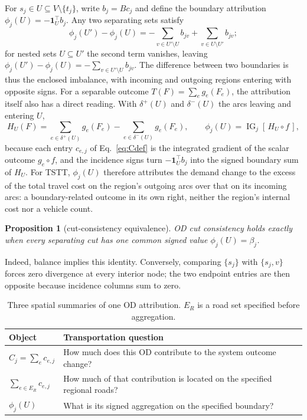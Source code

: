 \documentclass[a4paper,fleqn]{cas-sc}
\newtheorem*{uproposition}{Proposition}
\begin{document}
For $s_j\in U\subseteq V\setminus\{t_j\}$, write $b_j=Bc_j$ and define
the boundary attribution $\phi_j(U)=-\mathbf1_U^\top b_j$. Any two
separating sets satisfy
\begin{equation}
\phi_j(U')-\phi_j(U)
=-\sum_{v\in U'\setminus U}b_{jv}
+\sum_{v\in U\setminus U'}b_{jv};
\label{eq:cutdiff}
\end{equation}
for nested sets $U\subseteq U'$ the second term vanishes, leaving
$\phi_j(U')-\phi_j(U)=-\sum_{v\in U'\setminus U}b_{jv}$.
The difference between two boundaries is thus the enclosed imbalance,
with incoming and outgoing regions entering with opposite signs.
For a separable outcome $T(F)=\sum_e g_e(F_e)$, the attribution itself
also has a direct reading. With $\delta^+(U)$ and $\delta^-(U)$ the
arcs leaving and entering $U$,
\begin{equation}
H_U(F)=\sum_{e\in\delta^+(U)}g_e(F_e)-\sum_{e\in\delta^-(U)}g_e(F_e),
\qquad
\phi_j(U)=\operatorname{IG}_j[\,H_U\circ f\,],
\label{eq:hboundary}
\end{equation}
because each entry $c_{e,j}$ of Eq.~\eqref{eq:Cdef} is the
integrated gradient of the scalar outcome $g_e\circ f$, and the
incidence signs turn $-\mathbf 1_U^\top b_j$ into the
signed boundary sum of $H_U$. For TSTT, $\phi_j(U)$ therefore
attributes the demand change to the excess of the total travel cost on
the region's outgoing arcs over that on its incoming arcs: a
boundary-related outcome in its own right, neither the region's
internal cost nor a vehicle count.
\begin{uproposition}[cut-consistency equivalence]\label{par:cutequiv}
OD cut consistency holds exactly when every separating cut has one common
signed value $\phi_j(U)=\beta_j$.
\end{uproposition}
Indeed, balance implies this identity. Conversely, comparing $\{s_j\}$
with $\{s_j,v\}$ forces zero divergence at every interior node; the two
endpoint entries are then opposite because incidence columns sum to zero.

\begin{table}[pos=tb]
\footnotesize
\caption{Three spatial summaries of one OD attribution. $E_R$ is a road set
specified before aggregation.}\label{tab:objects}
\begin{tabular*}{\tblwidth}{@{}p{5cm}p{9cm}@{}}
\toprule Object & Transportation question\\\midrule
$C_j=\sum_ec_{e,j}$ & How much does this OD contribute to the system outcome change?\\
$\sum_{e\in E_R}c_{e,j}$ & How much of that contribution is located on the specified regional roads?\\
$\phi_j(U)$ & What is its signed aggregation on the specified boundary?\\
\bottomrule\end{tabular*}\end{table}
\end{document}
